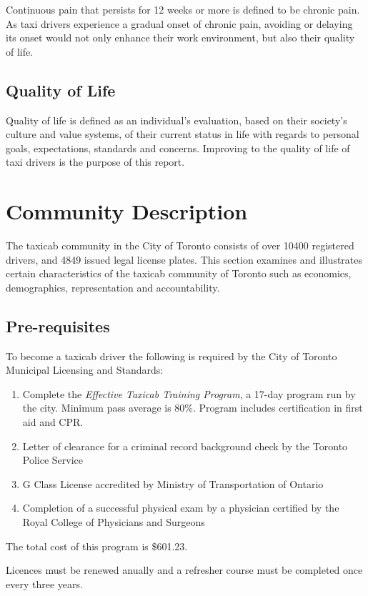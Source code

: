 \documentclass[11pt]{article}
\begin{document}
Continuous pain that persists for 12 weeks or more is defined to be
chronic pain\cite{chronic}. As taxi drivers experience a gradual onset of chronic
pain, avoiding or delaying its onset would not only enhance their work
environment, but also their quality of life.

\subsection{Quality of Life}
\label{sec:lifequal}

Quality of life is defined as an individual's evaluation, based on
their society's culture and value systems, of their current status in
life with regards to personal goals, expectations, standards and
concerns\cite{WHO}. Improving to the quality of life of taxi drivers is the
purpose of this report.

\section{Community Description}
\label{sec:community}
The taxicab community in the City of Toronto consists of over 10400 registered drivers, 
and 4849 issued legal license plates. This section examines and 
illustrates certain characteristics of the taxicab community of Toronto such as economics, 
demographics, representation and accountability.

\subsection{Pre-requisites}
To become a taxicab driver the following is required by the City of Toronto Municipal Licensing and Standards:
\begin{enumerate}
\item Complete the \emph{Effective Taxicab Training Program}, a 17-day program run by the city. 
Minimum pass average is 80\%. Program includes certification in first aid and CPR.
\item Letter of clearance for a criminal record background check by the Toronto Police Service
\item G Class License accredited by Ministry of Transportation of Ontario 
\item Completion of a successful physical exam by a physician certified by the Royal College of Physicians and Surgeons 
\end{enumerate}
The total cost of this program is \$601.23\cite{MLS2013}.

Licences must be renewed anually %
and a refresher course must be completed once every three years\cite{MLSChp545}.
\end{document}
